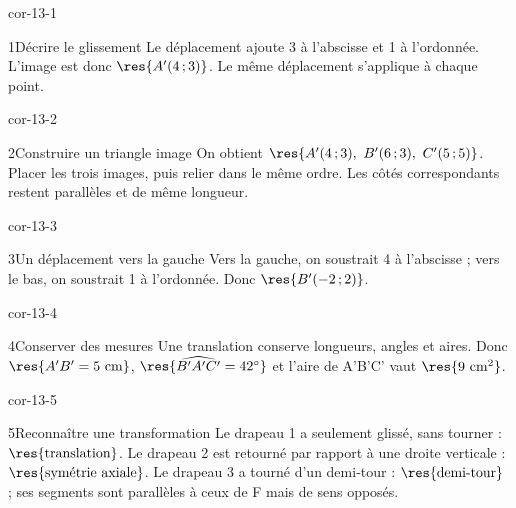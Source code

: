 \clearpage\pagestyle{otMain}\setlength{\otBlocEspacement}{2.5mm}\fontsize{11}{15}\selectfont{}
\begin{blocLivre}{cor-13-1}\begin{corrige}{1}{Décrire le glissement}
Le déplacement ajoute 3 à l’abscisse et 1 à l’ordonnée. L’image est donc $\res{A'(4\,;3)}$. Le même déplacement s’applique à chaque point.
\label{fig-cor-13-1}
\end{corrige}\end{blocLivre}
\begin{blocLivre}{cor-13-2}\begin{corrige}{2}{Construire un triangle image}
On obtient $\res{A'(4\,;3),\ B'(6\,;3),\ C'(5\,;5)}$. Placer les trois images, puis relier dans le même ordre. Les côtés correspondants restent parallèles et de même longueur.
\label{fig-cor-13-2}
\end{corrige}\end{blocLivre}
\begin{blocLivre}{cor-13-3}\begin{corrige}{3}{Un déplacement vers la gauche}
Vers la gauche, on soustrait 4 à l’abscisse ; vers le bas, on soustrait 1 à l’ordonnée. Donc $\res{B'(-2\,;2)}$.
\label{fig-cor-13-3}
\end{corrige}\end{blocLivre}
\begin{blocLivre}{cor-13-4}\begin{corrige}{4}{Conserver des mesures}
Une translation conserve longueurs, angles et aires. Donc $\res{A'B'=5\ \mathrm{cm}}$, $\res{\widehat{B'A'C'}=42^\circ}$ et l’aire de A’B’C’ vaut $\res{9\ \mathrm{cm}^2}$.
\label{fig-cor-13-4}
\end{corrige}\end{blocLivre}
\begin{blocLivre}{cor-13-5}\begin{corrige}{5}{Reconnaître une transformation}
Le drapeau 1 a seulement glissé, sans tourner : $\res{\text{translation}}$. Le drapeau 2 est retourné par rapport à une droite verticale : $\res{\text{symétrie axiale}}$. Le drapeau 3 a tourné d’un demi-tour : $\res{\text{demi-tour}}$ ; ses segments sont parallèles à ceux de F mais de sens opposés.
\label{fig-cor-13-5}
\end{corrige}\end{blocLivre}
